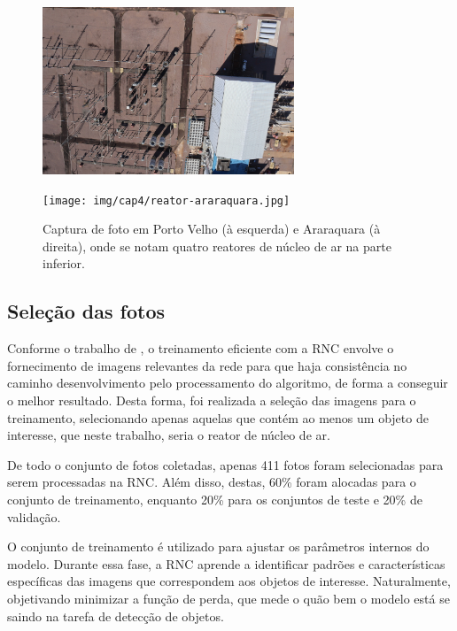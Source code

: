 \begin{figure}[!h]
    \centering
    \begin{minipage}[b]{0.45\linewidth}
        \centering
        \includegraphics[height=5cm]{img/cap4/reator-porto-velho.jpeg}
    \end{minipage}
    \hspace{0.05\linewidth}
    \begin{minipage}[b]{0.45\linewidth}
        \centering
        \texttt{[image: img/cap4/reator-araraquara.jpg]}
    \end{minipage}
    \captionsetup{justification=centering,margin=0.5cm,font=small}
    \caption{Captura de foto em Porto Velho (à esquerda) e Araraquara (à direita), onde se notam quatro reatores de núcleo de ar na parte inferior.} 
    \label{fig:reatores}
\end{figure}

\subsection{Seleção das fotos}

Conforme o trabalho de \cite{sa2024yolov8}, o treinamento eficiente com a RNC envolve o fornecimento de imagens relevantes da rede para que haja consistência no caminho desenvolvimento pelo processamento do algoritmo, de forma a conseguir o melhor resultado. Desta forma, foi realizada a seleção das imagens para o treinamento, selecionando apenas aquelas que contém ao menos um objeto de interesse, que neste trabalho, seria o reator de núcleo de ar.

De todo o conjunto de fotos coletadas, apenas 411 fotos foram selecionadas para serem processadas na RNC. Além disso, destas, 60\% foram alocadas para o conjunto de treinamento, enquanto 20\% para os conjuntos de teste e 20\% de validação.

O conjunto de treinamento é utilizado para ajustar os parâmetros internos do modelo. Durante essa fase, a RNC aprende a identificar padrões e características específicas das imagens que correspondem aos objetos de interesse. Naturalmente, objetivando minimizar a função de perda, que mede o quão bem o modelo está se saindo na tarefa de detecção de objetos.

